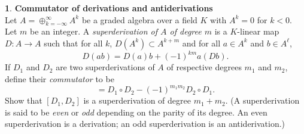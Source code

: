 \documentclass[12pt]{article}
\theoremstyle{definition}
\newtheorem{ex}{}[section]
\begin{document}
\begin{ex}
	\textbf{Commutator of derivations and antiderivations} \\
	Let $A = \oplus_{k=-\infty}^\infty A^k$ be a graded algebra over a field $K$ with $A^k = 0$ for $k < 0$.
	Let $m$ be an integer. A \textit{superderivation of $A$ of degree $m$} is a $K$-linear map $D: A \to A$ such that for all $k$, $D(A^k) \subset A^{k + m}$ and for all $a \in A^k$ and $b \in A^\ell$, \begin{equation*}
		D(ab) = D(a)b + (-1)^{km} a(Db).
	\end{equation*}
	If $D_1$ and $D_2$ are two superderivations of $A$ of respective degrees $m_1$ and $m_2$, define their \textit{commutator} to be \begin{equation*}
		[D_1, D_2] = D_1 \circ D_2 - (-1)^{m_1m_2}D_2 \circ D_1.
	\end{equation*}
	Show that $[D_1, D_2]$ is a superderivation of degree $m_1 + m_2$.
	(A superderivation is said to be \textit{even} or \textit{odd} depending on the parity of its degree.
	An even superderivation is a derivation; an odd superderivation is an antiderivation.)
\end{ex}
\end{document}
